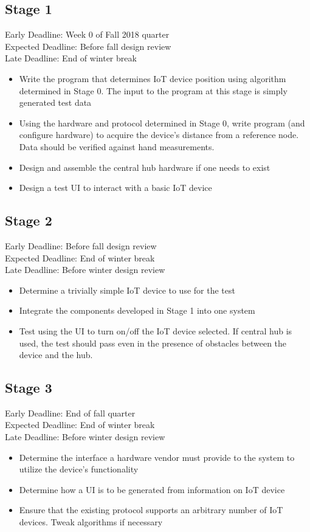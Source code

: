\documentclass{article}
\begin{document}
\subsection{Stage 1}
Early Deadline: Week 0 of Fall 2018 quarter \\
Expected Deadline: Before fall design review \\
Late Deadline: End of winter break \\
\begin{itemize}
\item Write the program that determines IoT device position using algorithm determined in Stage 0. The input to the program at this stage is simply generated test data
\item Using the hardware and protocol determined in Stage 0, write program (and configure hardware) to acquire the device's distance from a reference node. Data should be verified against hand measurements.
\item Design and assemble the central hub hardware if one needs to exist
\item Design a test UI to interact with a basic IoT device
\end{itemize}

\subsection{Stage 2}
Early Deadline: Before fall design review \\
Expected Deadline: End of winter break \\
Late Deadline: Before winter design review \\
\begin{itemize}
\item Determine a trivially simple IoT device to use for the test
\item Integrate the components developed in Stage 1 into one system
\item Test using the UI to turn on/off the IoT device selected. If central hub is used, the test should pass even in the presence of obstacles between the device and the hub.
\end{itemize}

\subsection{Stage 3}
Early Deadline: End of fall quarter \\
Expected Deadline: End of winter break \\
Late Deadline: Before winter design review \\
\begin{itemize}
\item Determine the interface a hardware vendor must provide to the system to utilize the device's functionality
\item Determine how a UI is to be generated from information on IoT device
\item Ensure that the existing protocol supports an arbitrary number of IoT devices. Tweak algorithms if necessary
\end{itemize}
\end{document}
